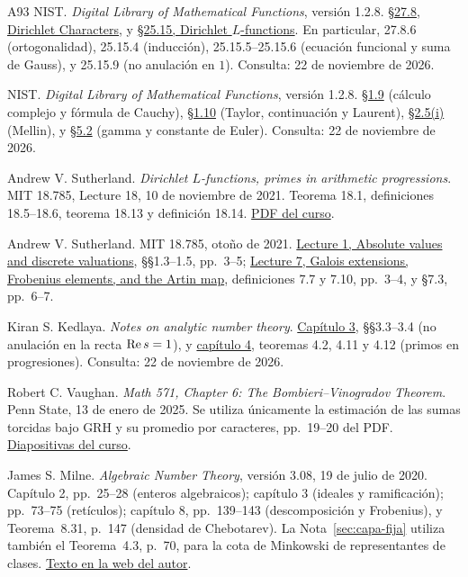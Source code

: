 \begin{thebibliography}{A93}
NIST. \emph{Digital Library of Mathematical Functions}, versión 1.2.8.
\href{https://dlmf.nist.gov/27.8}{§27.8, Dirichlet Characters}, y
\href{https://dlmf.nist.gov/25.15}{§25.15, Dirichlet $L$-functions}.
En particular, 27.8.6 (ortogonalidad), 25.15.4 (inducción),
25.15.5--25.15.6 (ecuación funcional y suma de Gauss), y 25.15.9
(no anulación en $1$). Consulta: 22 de noviembre de 2026.

NIST. \emph{Digital Library of Mathematical Functions}, versión 1.2.8.
\href{https://dlmf.nist.gov/1.9}{§1.9} (cálculo complejo y fórmula de Cauchy),
\href{https://dlmf.nist.gov/1.10}{§1.10} (Taylor, continuación y Laurent),
\href{https://dlmf.nist.gov/2.5}{§2.5(i)} (Mellin), y
\href{https://dlmf.nist.gov/5.2}{§5.2} (gamma y constante de Euler).
Consulta: 22 de noviembre de 2026.

Andrew V. Sutherland. \emph{Dirichlet $L$-functions, primes in arithmetic
progressions}. MIT 18.785, Lecture 18, 10 de noviembre de 2021.
Teorema 18.1, definiciones 18.5--18.6, teorema 18.13 y definición 18.14.
\href{https://ocw.mit.edu/courses/18-785-number-theory-i-fall-2021/mit18_785f21_lec18.pdf}{PDF del curso}.

Andrew V. Sutherland. MIT 18.785, otoño de 2021.
\href{https://ocw.mit.edu/courses/18-785-number-theory-i-fall-2021/mit18_785f21_lec1.pdf}{Lecture 1, Absolute values and discrete valuations},
§§1.3--1.5, pp.~3--5;
\href{https://ocw.mit.edu/courses/18-785-number-theory-i-fall-2021/mit18_785f21_lec7.pdf}{Lecture 7, Galois extensions, Frobenius elements, and the Artin map},
definiciones 7.7 y 7.10, pp.~3--4, y §7.3, pp.~6--7.

Kiran S. Kedlaya. \emph{Notes on analytic number theory}.
\href{https://kskedlaya.org/ant/chap-lfunc.html}{Capítulo 3},
§§3.3--3.4 (no anulación en la recta $\operatorname{Re} s=1$), y
\href{https://kskedlaya.org/ant/chap-primes-in-ap.html}{capítulo 4},
teoremas 4.2, 4.11 y 4.12 (primos en progresiones).
Consulta: 22 de noviembre de 2026.

Robert C. Vaughan. \emph{Math 571, Chapter 6: The Bombieri--Vinogradov
Theorem}. Penn State, 13 de enero de 2025.
Se utiliza únicamente la estimación de las sumas torcidas bajo GRH
y su promedio por caracteres, pp.~19--20 del PDF.
\href{https://personal.science.psu.edu/rcv4/571s25/Class571-06.pdf}{Diapositivas del curso}.

James S. Milne. \emph{Algebraic Number Theory}, versión 3.08,
19 de julio de 2020. Capítulo 2, pp.~25--28 (enteros algebraicos);
capítulo 3 (ideales y ramificación); pp.~73--75 (retículos);
capítulo 8, pp.~139--143 (descomposición y Frobenius),
y Teorema~8.31, p.~147 (densidad de Chebotarev).
La Nota~\ref{sec:capa-fija} utiliza también el Teorema~4.3,
p.~70, para la cota de Minkowski de representantes de clases.
\href{https://www.jmilne.org/math/CourseNotes/ANT.pdf}{Texto en la web del autor}.


\end{thebibliography}

